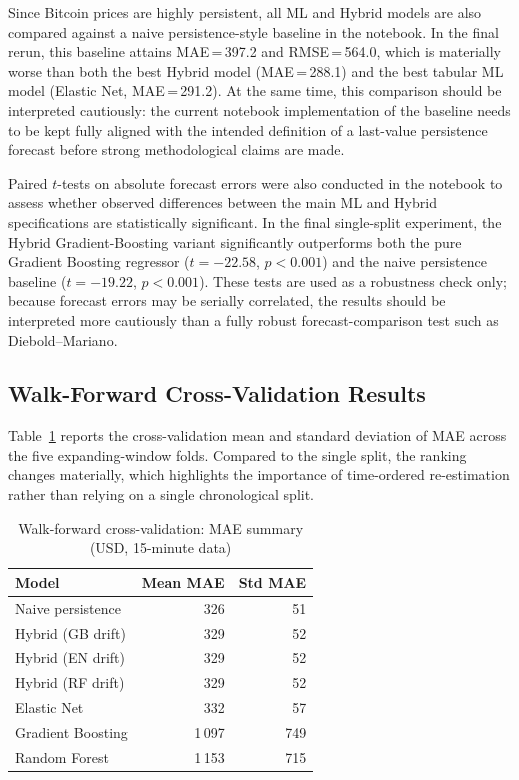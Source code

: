 \documentclass[12pt, a4paper, oneside]{report}
\theoremstyle{plain}
\theoremstyle{definition}
\theoremstyle{remark}
\begin{document}
Since Bitcoin prices are highly persistent, all ML and Hybrid models are also
compared against a naive persistence-style baseline in the notebook.  In the
final rerun, this baseline attains MAE\,=\,397.2 and RMSE\,=\,564.0, which is
materially worse than both the best Hybrid model (MAE\,=\,288.1) and the best
tabular ML model (Elastic Net, MAE\,=\,291.2).  At the same time, this
comparison should be interpreted cautiously: the current notebook implementation
of the baseline needs to be kept fully aligned with the intended definition of a
last-value persistence forecast before strong methodological claims are made.

Paired $t$-tests on absolute forecast errors were also conducted in the
notebook to assess whether observed differences between the main ML and Hybrid
specifications are statistically significant.  In the final single-split
experiment, the Hybrid Gradient-Boosting variant significantly outperforms both
the pure Gradient Boosting regressor ($t = -22.58$, $p < 0.001$) and the naive
persistence baseline ($t = -19.22$, $p < 0.001$).  These tests are used as a
robustness check only; because forecast errors may be serially correlated, the
results should be interpreted more cautiously than a fully robust
forecast-comparison test such as Diebold--Mariano.

\subsection{Walk-Forward Cross-Validation Results}

Table~\ref{tab:wf_results} reports the cross-validation mean and standard
deviation of MAE across the five expanding-window folds.  Compared to the
single split, the ranking changes materially, which highlights the importance of
time-ordered re-estimation rather than relying on a single chronological split.

\begin{table}[H]
\begin{singlespace}
\fontsize{10}{11}\selectfont
\caption{Walk-forward cross-validation: MAE summary (USD, 15-minute data)}
\label{tab:wf_results}
\begin{tabular}{@{}lrr@{}}
\toprule
Model & Mean MAE & Std MAE \\
\midrule
Naive persistence & 326 & 51 \\
Hybrid (GB drift)  & 329 & 52 \\
Hybrid (EN drift)  & 329 & 52 \\
Hybrid (RF drift)  & 329 & 52 \\
Elastic Net        & 332 & 57 \\
Gradient Boosting  & 1\,097 & 749 \\
Random Forest      & 1\,153 & 715 \\
\bottomrule
\end{tabular}
\end{singlespace}
\end{table}
\end{document}
